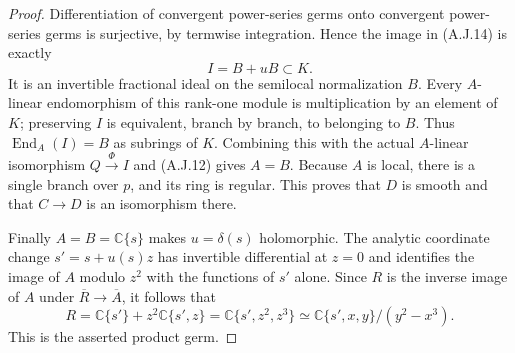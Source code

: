 \begin{proof}
Differentiation of convergent power-series germs onto
convergent power-series germs is surjective, by termwise
integration. Hence the image in (A.J.14) is exactly
\[
 I=B+uB\subset K.                                \tag{A.J.15}
\]
It is an invertible fractional ideal on the semilocal
normalization $B$. Every $A$-linear endomorphism of this
rank-one module is multiplication by an element of $K$;
preserving $I$ is equivalent, branch by branch, to belonging
to $B$. Thus $\operatorname{End}_A(I)=B$ as subrings of
$K$. Combining this with the actual $A$-linear isomorphism
$Q\xrightarrow{\Phi}I$ and (A.J.12) gives $A=B$.
Because $A$ is local, there is a single branch over $p$,
and its ring is regular. This proves that $D$ is smooth
and that $C\to D$ is an isomorphism there.

Finally $A=B=\mathbb C\{s\}$ makes $u=\delta(s)$
holomorphic. The analytic coordinate change
$s'=s+u(s)z$ has invertible differential at $z=0$ and
identifies the image of $A$ modulo $z^2$ with the functions
of $s'$ alone. Since $R$ is the inverse image of $A$ under
$\overline R\to\overline A$, it follows that
\[
 R=\mathbb C\{s'\}+z^2\mathbb C\{s',z\}
   =\mathbb C\{s',z^2,z^3\}
   \simeq\mathbb C\{s',x,y\}/(y^2-x^3).
                                                        \tag{A.J.16}
\]
This is the asserted product germ.
\end{proof}



